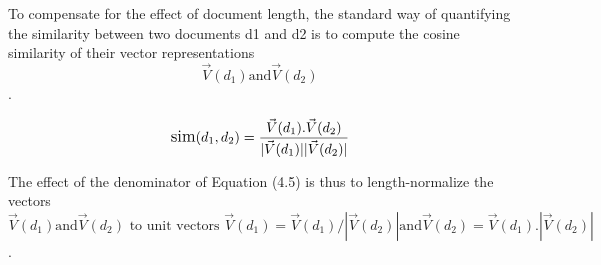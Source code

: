 To compensate for the effect of document length, the standard way of
quantifying the similarity between two documents d1 and d2 is to compute
the cosine similarity of their vector representations \displaystyle $$\vec{V}(d_1) \textrm{and} \vec{V}(d_2) $$.

\begin{equation}
    \large
         \text{sim}(d_1 ,d_2) \\
         =\frac{\vec{V}( d_1 ) . \vec{V}( d_2 ) } {|\vec{V}( d_1 )| |\vec{V}( d_2 )|}
\end{equation}


The effect of the denominator of Equation (4.5) is thus to length-normalize
the vectors \displaystyle $$\vec{V}(d_1) \textrm{and}\vec{V}(d_2)
\textrm{ to unit vectors } \vec{V}(d_1) = \vec{V}(d_1) /|\vec{V}(d_2)|  \textrm{and} \vec{V}(d_2) = \vec{V}(d_1) .|\vec{V}(d_2)|$$.

